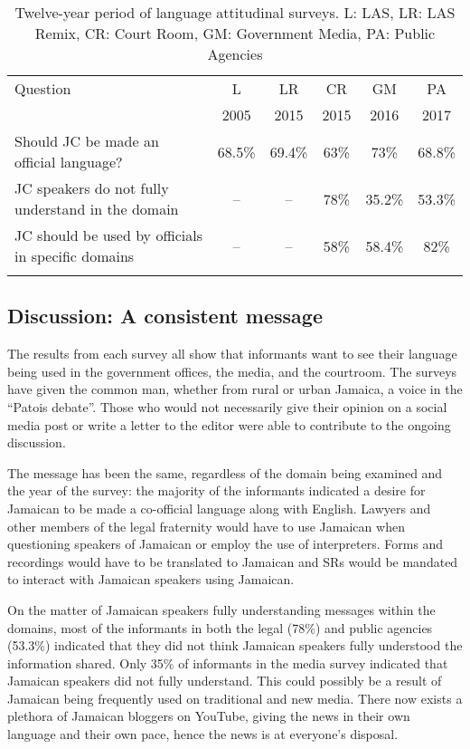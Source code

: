 \documentclass[output=paper,colorlinks,citecolor=brown]{langscibook}
\begin{document}
\begin{table}
\caption{Twelve-year period of language attitudinal surveys. L: LAS, LR: LAS Remix, CR: Court Room, GM: Government Media, PA: Public Agencies\label{tab:02:2}}
\begin{tabularx}{\textwidth}{Q *5{c}}
    \lsptoprule
    Question & L  & LR  & CR  & GM  & PA\\
             & 2005 & 2015 & 2015 &  2016 &  2017\\
    \midrule
    Should JC be made an official language? & 68.5\% & 69.4\% & 63\% & 73\% & 68.8\%\\
    \tablevspace
    JC speakers do not fully understand in the domain & -- & -- & 78\% & 35.2\% & 53.3\%\\
    \tablevspace
    JC should be used by officials in specific domains &-- &-- & 58\% & 58.4\% & 82\%\\		
    \lspbottomrule
\end{tabularx}
\end{table}

\subsection{Discussion: A consistent message}

The results from each survey all show that informants want to see their language being used in the government offices, the media, and the courtroom. The surveys have given the common man, whether from rural or urban Jamaica, a voice in the “Patois debate”. Those who would not necessarily give their opinion on a social media post or write a letter to the editor were able to contribute to the ongoing discussion.

The message has been the same, regardless of the domain being examined and the year of the survey: the majority of the informants indicated a desire for Jamaican to be made a co-official language along with English. Lawyers and other members of the legal fraternity would have to use Jamaican when questioning speakers of Jamaican or employ the use of interpreters. Forms and recordings would have to be translated to Jamaican and SRs would be mandated to interact with Jamaican speakers using Jamaican. 

On the matter of Jamaican speakers fully understanding messages within the domains, most of the informants in both the legal (78\%) and public agencies (53.3\%) indicated that they did not think Jamaican speakers fully understood the information shared. Only 35\% of informants in the media survey indicated that Jamaican speakers did not fully understand. This could possibly be a result of Jamaican being frequently used on traditional and new media. There now exists a plethora of Jamaican bloggers on YouTube, giving the news in their own language and their own pace, hence the news is at everyone’s disposal.  
\end{document}

